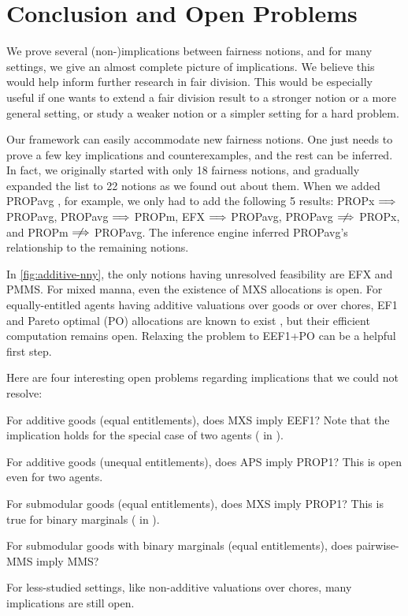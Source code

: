 \section{Conclusion and Open Problems}
\label{sec:conclusion}

We prove several (non-)implications between fairness notions,
and for many settings, we give an almost complete picture of implications.
We believe this would help inform further research in fair division.
This would be especially useful if one wants to extend a fair division result
to a stronger notion or a more general setting,
or study a weaker notion or a simpler setting for a hard problem.

Our framework can easily accommodate new fairness notions.
One just needs to prove a few key implications and counterexamples, and the rest can be inferred.
In fact, we originally started with only 18 fairness notions, and gradually expanded the list
to 22 notions as we found out about them.
When we added PROPavg \citep{kobayashi2025proportional}, for example, we only had to add the following 5 results:
PROPx $\Longrightarrow$ PROPavg, PROPavg $\Longrightarrow$ PROPm, EFX $\Longrightarrow$ PROPavg,
PROPavg $\nfimplies$ PROPx, and PROPm $\nfimplies$ PROPavg.
The inference engine inferred PROPavg's relationship to the remaining notions.

In \cref{fig:additive-nny}, the only notions having unresolved feasibility are EFX and PMMS.
For mixed manna, even the existence of MXS allocations is open.
%
For equally-entitled agents having additive valuations over goods or over chores,
EF1 and Pareto optimal (PO) allocations are known to exist
\citep{caragiannis2019unreasonable,barman2018finding,mahara2025existence},
but their efficient computation remains open.
Relaxing the problem to EEF1+PO can be a helpful first step.

Here are four interesting open problems regarding implications that we could not resolve:
\begin{tightenum}
\item For additive goods (equal entitlements), does MXS imply EEF1?
    Note that the implication holds for the special case of two agents
    ( in ).
\item For additive goods (unequal entitlements), does APS imply PROP1?
    This is open even for two agents.
\item For submodular goods (equal entitlements), does MXS imply PROP1?
    This is true for binary marginals
    ( in ).
\item For submodular goods with binary marginals (equal entitlements),
    does pairwise-MMS imply MMS?
\end{tightenum}
For less-studied settings, like non-additive valuations over chores,
many implications are still open.

